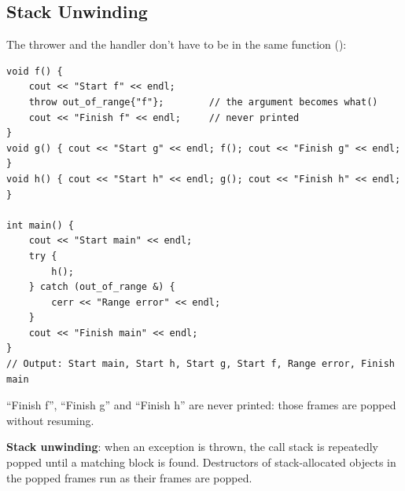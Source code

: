 \subsection{Stack Unwinding}
The thrower and the handler don't have to be in the same function
():
\begin{lstlisting}[style=cpp]
void f() {
    cout << "Start f" << endl;
    throw out_of_range{"f"};        // the argument becomes what()
    cout << "Finish f" << endl;     // never printed
}
void g() { cout << "Start g" << endl; f(); cout << "Finish g" << endl; }
void h() { cout << "Start h" << endl; g(); cout << "Finish h" << endl; }

int main() {
    cout << "Start main" << endl;
    try {
        h();
    } catch (out_of_range &) {
        cerr << "Range error" << endl;
    }
    cout << "Finish main" << endl;
}
// Output: Start main, Start h, Start g, Start f, Range error, Finish main
\end{lstlisting}
\begin{center}
\end{center}
``Finish f'', ``Finish g'' and ``Finish h'' are never printed: those frames are popped
without resuming.

\begin{definition}
\textbf{Stack unwinding}: when an exception is thrown, the call stack is
repeatedly popped until a matching  block is found. Destructors of
stack-allocated objects in the popped frames run as their frames are popped.
\end{definition}

